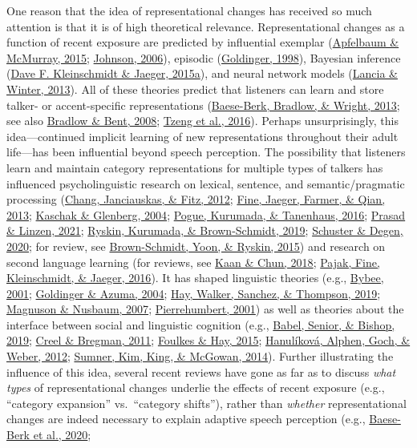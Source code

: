 \documentclass[
  11pt,
  english,
  man,floatsintext]{apa6}
\begin{document}
One reason that the idea of representational changes has received so much attention is that it is of high theoretical relevance. Representational changes as a function of recent exposure are predicted by influential exemplar (\protect\hyperlink{ref-apfelbaum-mcmurray2015}{Apfelbaum \& McMurray, 2015}; \protect\hyperlink{ref-johnson2006}{Johnson, 2006}), episodic (\protect\hyperlink{ref-goldinger1998}{Goldinger, 1998}), Bayesian inference (\protect\hyperlink{ref-kleinschmidt-jaeger2015}{Dave F. Kleinschmidt \& Jaeger, 2015a}), and neural network models (\protect\hyperlink{ref-lancia-winter2013}{Lancia \& Winter, 2013}). All of these theories predict that listeners can learn and store talker- or accent-specific representations (\protect\hyperlink{ref-baeseberk2013}{Baese-Berk, Bradlow, \& Wright, 2013}; see also \protect\hyperlink{ref-bradlow-bent2008}{Bradlow \& Bent, 2008}; \protect\hyperlink{ref-tzeng2016}{Tzeng et al., 2016}). Perhaps unsurprisingly, this idea---continued implicit learning of new representations throughout their adult life---has been influential beyond speech perception. The possibility that listeners learn and maintain category representations for multiple types of talkers has influenced psycholinguistic research on lexical, sentence, and semantic/pragmatic processing (\protect\hyperlink{ref-chang2012}{Chang, Janciauskas, \& Fitz, 2012}; \protect\hyperlink{ref-fine2013}{Fine, Jaeger, Farmer, \& Qian, 2013}; \protect\hyperlink{ref-kaschak2004}{Kaschak \& Glenberg, 2004}; \protect\hyperlink{ref-pogue2016}{Pogue, Kurumada, \& Tanenhaus, 2016}; \protect\hyperlink{ref-prasad2021}{Prasad \& Linzen, 2021}; \protect\hyperlink{ref-ryskin2019}{Ryskin, Kurumada, \& Brown-Schmidt, 2019}; \protect\hyperlink{ref-schuster-degen2020}{Schuster \& Degen, 2020}; for review, see \protect\hyperlink{ref-brown-schmidt2015}{Brown-Schmidt, Yoon, \& Ryskin, 2015}) and research on second language learning (for reviews, see \protect\hyperlink{ref-kaan-chun2018}{Kaan \& Chun, 2018}; \protect\hyperlink{ref-pajak2016}{Pajak, Fine, Kleinschmidt, \& Jaeger, 2016}). It has shaped linguistic theories (e.g., \protect\hyperlink{ref-bybee2001}{Bybee, 2001}; \protect\hyperlink{ref-goldinger-azuma2004}{Goldinger \& Azuma, 2004}; \protect\hyperlink{ref-hay2019}{Hay, Walker, Sanchez, \& Thompson, 2019}; \protect\hyperlink{ref-magnuson-nusbaum2007}{Magnuson \& Nusbaum, 2007}; \protect\hyperlink{ref-pierrehumbert2001}{Pierrehumbert, 2001}) as well as theories about the interface between social and linguistic cognition (e.g., \protect\hyperlink{ref-babel2019}{Babel, Senior, \& Bishop, 2019}; \protect\hyperlink{ref-creel-bregman2011}{Creel \& Bregman, 2011}; \protect\hyperlink{ref-foulkes-hay2015}{Foulkes \& Hay, 2015}; \protect\hyperlink{ref-hanulikova2012}{Hanulíková, Alphen, Goch, \& Weber, 2012}; \protect\hyperlink{ref-sumner2014}{Sumner, Kim, King, \& McGowan, 2014}). Further illustrating the influence of this idea, several recent reviews have gone as far as to discuss \emph{what types} of representational changes underlie the effects of recent exposure (e.g., ``category expansion'' vs.~``category shifts''), rather than \emph{whether} representational changes are indeed necessary to explain adaptive speech perception (e.g., \protect\hyperlink{ref-baeseberk2020}{Baese-Berk et al., 2020}; 
\end{document}
